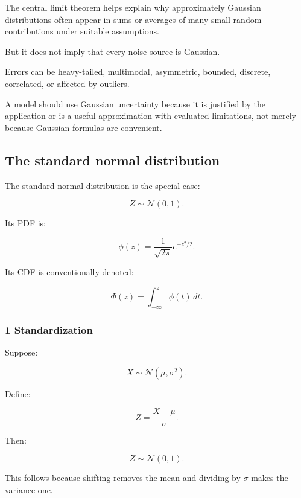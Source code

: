 \hypertarget{02-foundations-ii-ch023-gaussian-assumptions-and-the-central-limit-theorem}{}

The central limit theorem helps explain why approximately Gaussian distributions often appear in sums or averages of many small random contributions under suitable assumptions.

But it does not imply that every noise source is Gaussian.

Errors can be heavy-tailed, multimodal, asymmetric, bounded, discrete, correlated, or affected by outliers.

A model should use Gaussian uncertainty because it is justified by the application or is a useful approximation with evaluated limitations, not merely because Gaussian formulas are convenient.

\subsection{The standard normal distribution}\label{02-foundations-ii-ch023-the-standard-normal-distribution}

\hypertarget{02-foundations-ii-ch023-the-standard-normal-distribution}{}

The standard \hyperref[02-foundations-ii-ch023-discrete-and-continuous-distribution-families]{normal distribution} is the special case:

\[
 \boxed{Z\sim\mathcal N(0,1)}.
\]

Its PDF is:

\[
 \boxed{ \phi(z)= \frac1{\sqrt{2\pi}}e^{-z^2/2} }.
\]

Its CDF is conventionally denoted:

\[
 \boxed{ \Phi(z)= \int_{-\infty}^{z}\phi(t)\,dt }.
\]

\subsubsection{1 Standardization}\label{02-foundations-ii-ch023-standardization}

\hypertarget{02-foundations-ii-ch023-standardization}{}

Suppose:

\[
 X\sim\mathcal N(\mu,\sigma^2).
\]

Define:

\[
 \boxed{ Z=\frac{X-\mu}{\sigma} }.
\]

Then:

\[
 Z\sim\mathcal N(0,1).
\]

This follows because shifting removes the mean and dividing by \(\sigma\) makes the variance one.

